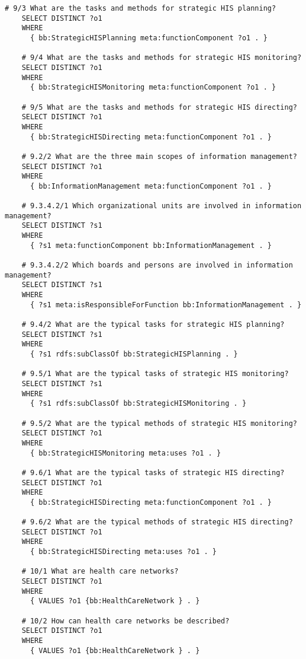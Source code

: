 \begin{lstlisting}[language=SPARQL]
    # 9/3 What are the tasks and methods for strategic HIS planning?
    SELECT DISTINCT ?o1
    WHERE
      { bb:StrategicHISPlanning meta:functionComponent ?o1 . }
    
    # 9/4 What are the tasks and methods for strategic HIS monitoring?
    SELECT DISTINCT ?o1
    WHERE
      { bb:StrategicHISMonitoring meta:functionComponent ?o1 . }
    
    # 9/5 What are the tasks and methods for strategic HIS directing?
    SELECT DISTINCT ?o1
    WHERE
      { bb:StrategicHISDirecting meta:functionComponent ?o1 . }
    
    # 9.2/2 What are the three main scopes of information management?
    SELECT DISTINCT ?o1
    WHERE
      { bb:InformationManagement meta:functionComponent ?o1 . }
    
    # 9.3.4.2/1 Which organizational units are involved in information management?
    SELECT DISTINCT ?s1
    WHERE
      { ?s1 meta:functionComponent bb:InformationManagement . }
    
    # 9.3.4.2/2 Which boards and persons are involved in information management?
    SELECT DISTINCT ?s1
    WHERE
      { ?s1 meta:isResponsibleForFunction bb:InformationManagement . }
    
    # 9.4/2 What are the typical tasks for strategic HIS planning?
    SELECT DISTINCT ?s1
    WHERE
      { ?s1 rdfs:subClassOf bb:StrategicHISPlanning . }
    
    # 9.5/1 What are the typical tasks of strategic HIS monitoring?
    SELECT DISTINCT ?s1
    WHERE
      { ?s1 rdfs:subClassOf bb:StrategicHISMonitoring . }
    
    # 9.5/2 What are the typical methods of strategic HIS monitoring?
    SELECT DISTINCT ?o1
    WHERE
      { bb:StrategicHISMonitoring meta:uses ?o1 . }
    
    # 9.6/1 What are the typical tasks of strategic HIS directing?
    SELECT DISTINCT ?o1
    WHERE
      { bb:StrategicHISDirecting meta:functionComponent ?o1 . }
    
    # 9.6/2 What are the typical methods of strategic HIS directing?
    SELECT DISTINCT ?o1
    WHERE
      { bb:StrategicHISDirecting meta:uses ?o1 . }
    
    # 10/1 What are health care networks?
    SELECT DISTINCT ?o1
    WHERE
      { VALUES ?o1 {bb:HealthCareNetwork } . }
    
    # 10/2 How can health care networks be described?
    SELECT DISTINCT ?o1
    WHERE
      { VALUES ?o1 {bb:HealthCareNetwork } . }
    
    \end{lstlisting}

